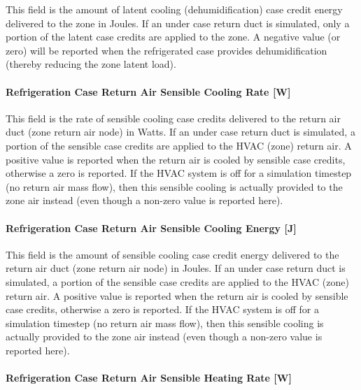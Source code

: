 This field is the amount of latent cooling (dehumidification) case credit energy delivered to the zone in Joules. If an under case return duct is simulated, only a portion of the latent case credits are applied to the zone. A negative value (or zero) will be reported when the refrigerated case provides dehumidification (thereby reducing the zone latent load).

\paragraph{Refrigeration Case Return Air Sensible Cooling Rate {[}W{]}}\label{refrigeration-case-return-air-sensible-cooling-rate-w}

This field is the rate of sensible cooling case credits delivered to the return air duct (zone return air node) in Watts. If an under case return duct is simulated, a portion of the sensible case credits are applied to the HVAC (zone) return air. A positive value is reported when the return air is cooled by sensible case credits, otherwise a zero is reported. If the HVAC system is off for a simulation timestep (no return air mass flow), then this sensible cooling is actually provided to the zone air instead (even though a non-zero value is reported here).

\paragraph{Refrigeration Case Return Air Sensible Cooling Energy {[}J{]}}\label{refrigeration-case-return-air-sensible-cooling-energy-j}

This field is the amount of sensible cooling case credit energy delivered to the return air duct (zone return air node) in Joules. If an under case return duct is simulated, a portion of the sensible case credits are applied to the HVAC (zone) return air. A positive value is reported when the return air is cooled by sensible case credits, otherwise a zero is reported. If the HVAC system is off for a simulation timestep (no return air mass flow), then this sensible cooling is actually provided to the zone air instead (even though a non-zero value is reported here).

\paragraph{Refrigeration Case Return Air Sensible Heating Rate {[}W{]}}\label{refrigeration-case-return-air-sensible-heating-rate-w}

